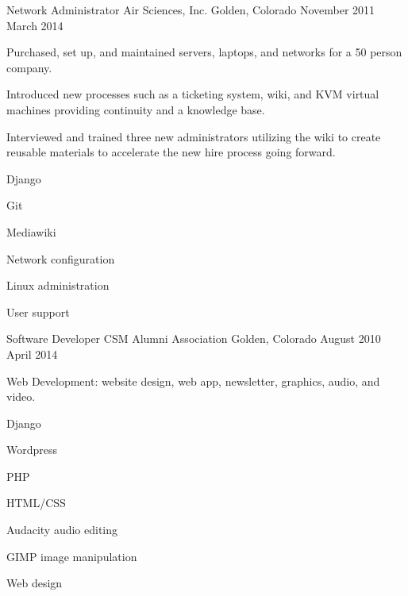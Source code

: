 \begin{cventries}
  \cventry%
    {Network Administrator} %
    {Air Sciences, Inc.} %
    {Golden, Colorado} %
    {November 2011 \- March 2014} %
    {%
      \begin{cvitems} %
        \item {Purchased, set up, and maintained servers, laptops, and networks for a 50 person company.}
        \item {Introduced new processes such as a ticketing system, wiki, and KVM virtual machines \- providing continuity and a knowledge base.}
        \item {Interviewed and trained three new administrators \- utilizing the wiki to create reusable materials to accelerate the new hire process going forward.}
      \end{cvitems}
    }
    \begin{cventryskills}
      \item Django
      \item Git
      \item Mediawiki
      \item Network configuration
      \item Linux administration
      \item User support
    \end{cventryskills}

  \cventry%
    {Software Developer} %
    {CSM Alumni Association} %
    {Golden, Colorado} %
    {August 2010 \- April 2014} %
    {%
      \begin{cvitems} %
        \item {Web Development: website design, web app, newsletter, graphics, audio, and video.}
      \end{cvitems}
    }
    \begin{cventryskills}
      \item Django
      \item Wordpress
      \item PHP
      \item HTML/CSS
      \item Audacity audio editing
      \item GIMP image manipulation
      \item Web design
    \end{cventryskills}
\end{cventries}
